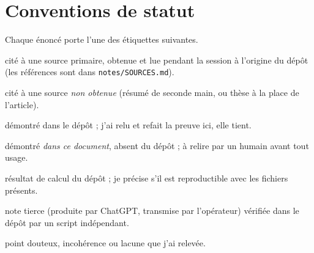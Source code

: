 \documentclass[11pt,a4paper]{article}
\theoremstyle{definition}
\theoremstyle{remark}
\newcommand{\st}[1]{\textbf{[#1]}}
\newcommand{\code}[1]{\texttt{#1}}
\begin{document}
\tableofcontents

\section*{Conventions de statut}
Chaque énoncé porte l'une des étiquettes suivantes.
\begin{description}[nosep]
\item[\st{S}] cité à une source primaire, obtenue et lue pendant la session à l'origine du dépôt (les références sont dans \code{notes/SOURCES.md}).
\item[\st{S?}] cité à une source \emph{non obtenue} (résumé de seconde main, ou thèse à la place de l'article).
\item[\st{R}] démontré dans le dépôt ; j'ai relu et refait la preuve ici, elle tient.
\item[\st{N}] démontré \emph{dans ce document}, absent du dépôt ; à relire par un humain avant tout usage.
\item[\st{C}] résultat de calcul du dépôt ; je précise s'il est reproductible avec les fichiers présents.
\item[\st{T}] note tierce (produite par ChatGPT, transmise par l'opérateur) vérifiée dans le dépôt par un script indépendant.
\item[\st{?}] point douteux, incohérence ou lacune que j'ai relevée.
\end{description}
\end{document}
